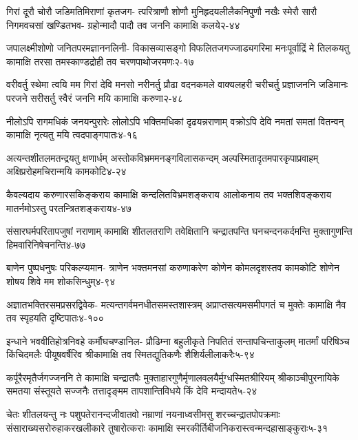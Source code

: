 \annofourlineindentedshloka
{गिरां दूरौ चोरौ जडिमतिमिराणां कृतजग-}
{त्परित्राणौ शोणौ मुनिहृदयलीलैकनिपुणौ}
{नखैः स्मेरौ सारौ निगमवचसां खण्डितभव-}
{ग्रहोन्मादौ पादौ तव जननि कामाक्षि कलये}{२-४४}

\annofourlineindentedshloka
{जपालक्ष्मीशोणो जनितपरमज्ञाननलिनी-}
{विकासव्यासङ्गो विफलितजगज्जाड्यगरिमा}
{मनःपूर्वाद्रिं मे तिलकयतु कामाक्षि तरसा}
{तमस्काण्डद्रोही तव चरणपाथोजरमणः}{२-१७}

\annofourlineindentedshloka
{वरीवर्तु स्थेमा त्वयि मम गिरां देवि मनसो}
{नरीनर्तु प्रौढा वदनकमले वाक्यलहरी}
{चरीचर्तु प्रज्ञाजननि जडिमानः परजने}
{सरीसर्तु स्वैरं जननि मयि कामाक्षि करुणा}{२-४८}

\annofourlineindentedshloka
{नीलोऽपि रागमधिकं जनयन्पुरारेः}
{लोलोऽपि भक्तिमधिकां दृढयन्नराणाम्}
{वक्रोऽपि देवि नमतां समतां वितन्वन्}
{कामाक्षि नृत्यतु मयि त्वदपाङ्गपातः}{४-१६}

\annofourlineindentedshloka
{अत्यन्तशीतलमतन्द्रयतु क्षणार्धम्}
{अस्तोकविभ्रममनङ्गविलासकन्दम्}
{अल्पस्मितादृतमपारकृपाप्रवाहम्}
{अक्षिप्ररोहमचिरान्मयि कामकोटि}{४-२४}

\annofourlineindentedshloka
{कैवल्यदाय करुणारसकिङ्कराय}
{कामाक्षि कन्दलितविभ्रमशङ्कराय}
{आलोकनाय तव भक्तशिवङ्कराय}
{मातर्नमोऽस्तु परतन्त्रितशङ्कराय}{४-४७}

\annofourlineindentedshloka
{संसारघर्मपरितापजुषां नराणाम्}
{कामाक्षि शीतलतराणि तवेक्षितानि}
{चन्द्रातपन्ति घनचन्दनकर्दमन्ति}
{मुक्तागुणन्ति हिमवारिनिषेचनन्ति}{४-७७}

\annofourlineindentedshloka
{बाणेन पुष्पधनुषः परिकल्प्यमान-}
{त्राणेन भक्तमनसां करुणाकरेण}
{कोणेन कोमलदृशस्तव कामकोटि}
{शोणेन शोषय शिवे मम शोकसिन्धुम्}{४-९४}

\annofourlineindentedshloka
{अज्ञातभक्तिरसमप्रसरद्विवेक-}
{मत्यन्तगर्वमनधीतसमस्तशास्त्रम्}
{अप्राप्तसत्यमसमीपगतं च मुक्तेः}
{कामाक्षि नैव तव स्पृहयति दृष्टिपातः}{४-१००}%

\annofourlineindentedshloka
{इन्धाने भववीतिहोत्रनिवहे कर्मौघचण्डानिल-}
{प्रौढिम्ना बहुलीकृते निपतितं सन्तापचिन्ताकुलम्}
{मातर्मां परिषिञ्च किंचिदमलैः पीयूषवर्षैरिव}
{श्रीकामाक्षि तव स्मितद्युतिकणैः शैशिर्यलीलाकरैः}{५-९४}

\annofourlineindentedshloka
{कर्पूरैरमृतैर्जगज्जननि ते कामाक्षि चन्द्रातपैः}
{मुक्ताहारगुणैर्मृणालवलयैर्मुग्धस्मितश्रीरियम्}
{श्रीकाञ्चीपुरनायिके समतया संस्तूयते सज्जनैः}
{तत्तादृङ्मम तापशान्तिविधये किं देवि मन्दायते}{५-२४}

\annofourlineindentedshloka
{चेतः शीतलयन्तु नः पशुपतेरानन्दजीवातवो}
{नम्राणां नयनाध्वसीमसु शरच्चन्द्रातपोपक्रमाः}
{संसाराख्यसरोरुहाकरखलीकारे तुषारोत्कराः}
{कामाक्षि स्मरकीर्तिबीजनिकरास्त्वन्मन्दहासाङ्कुराः}{५-३१}

